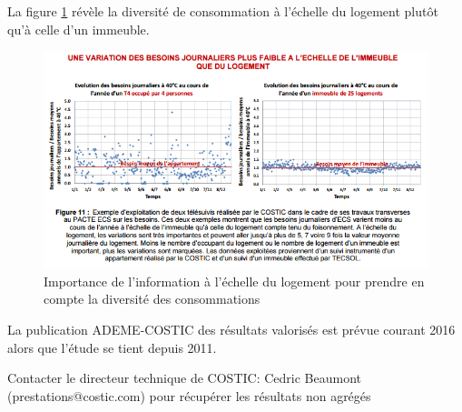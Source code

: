 La figure \ref{fig:Foisonnement_ECS} révèle la diversité de consommation à l'échelle du logement plutôt qu'à celle d'un immeuble.

\begin{figure}[h]
\centering
\includegraphics[scale=0.9]{Images/Foisonnement_ECS}
\caption{Importance de l'information à l'échelle du logement pour prendre en compte la diversité des consommations}
\label{fig:Foisonnement_ECS}
\end{figure}

La publication ADEME-COSTIC des résultats valorisés est prévue courant 2016 alors que l'étude se tient depuis 2011.

Contacter le directeur technique de COSTIC: Cedric Beaumont (prestations@costic.com) pour récupérer les résultats non agrégés 
